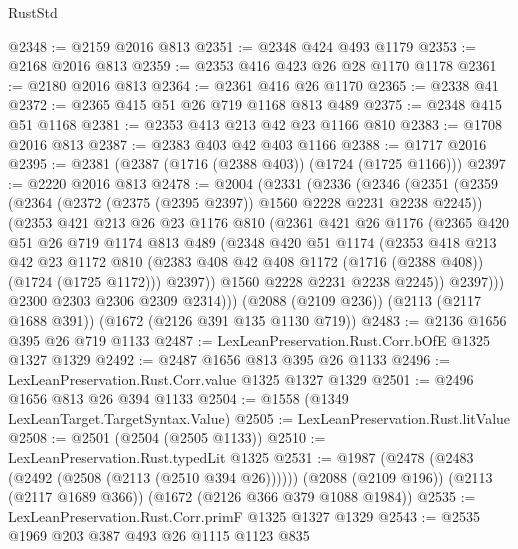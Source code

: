 \begin{lexlean}{RustStd}
\begin{coremodule}
@2348 := @2159 @2016 @813
@2351 := @2348 @424 @493 @1179
@2353 := @2168 @2016 @813
@2359 := @2353 @416 @423 @26 @28 @1170 @1178
@2361 := @2180 @2016 @813
@2364 := @2361 @416 @26 @1170
@2365 := @2338 @41
@2372 := @2365 @415 @51 @26 @719 @1168 @813 @489
@2375 := @2348 @415 @51 @1168
@2381 := @2353 @413 @213 @42 @23 @1166 @810
@2383 := @1708 @2016 @813
@2387 := @2383 @403 @42 @403 @1166
@2388 := @1717 @2016
@2395 := @2381 (@2387 (@1716 (@2388 @403)) (@1724 (@1725 @1166)))
@2397 := @2220 @2016 @813
@2478 := @2004
    (@2331
      (@2336
        (@2346
          (@2351
            (@2359
              (@2364 (@2372 (@2375 (@2395 @2397)) @1560 @2228 @2231 @2238 @2245))
              (@2353
                @421
                @213
                @26
                @23
                @1176
                @810
                (@2361
                  @421
                  @26
                  @1176
                  (@2365
                    @420
                    @51
                    @26
                    @719
                    @1174
                    @813
                    @489
                    (@2348
                      @420
                      @51
                      @1174
                      (@2353
                        @418
                        @213
                        @42
                        @23
                        @1172
                        @810
                        (@2383 @408 @42 @408 @1172 (@1716 (@2388 @408)) (@1724 (@1725 @1172)))
                        @2397))
                    @1560
                    @2228
                    @2231
                    @2238
                    @2245))
                @2397)))
          @2300
          @2303
          @2306
          @2309
          @2314)))
    (@2088 (@2109 @236))
    (@2113 (@2117 @1688 @391))
    (@1672 (@2126 @391 @135 @1130 @719))
@2483 := @2136 @1656 @395 @26 @719 @1133
@2487 := LexLeanPreservation.Rust.Corr.bOfE @1325 @1327 @1329
@2492 := @2487 @1656 @813 @395 @26 @1133
@2496 := LexLeanPreservation.Rust.Corr.value @1325 @1327 @1329
@2501 := @2496 @1656 @813 @26 @394 @1133
@2504 := @1558 (@1349 LexLeanTarget.TargetSyntax.Value)
@2505 := LexLeanPreservation.Rust.litValue
@2508 := @2501 (@2504 (@2505 @1133))
@2510 := LexLeanPreservation.Rust.typedLit @1325
@2531 := @1987
    (@2478 (@2483 (@2492 (@2508 (@2113 (@2510 @394 @26))))))
    (@2088 (@2109 @196))
    (@2113 (@2117 @1689 @366))
    (@1672 (@2126 @366 @379 @1088 @1984))
@2535 := LexLeanPreservation.Rust.Corr.primF @1325 @1327 @1329
@2543 := @2535 @1969 @203 @387 @493 @26 @1115 @1123 @835

\end{coremodule}
\end{lexlean}
